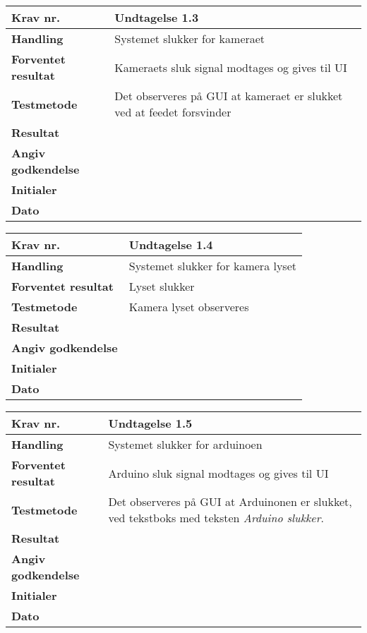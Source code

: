 	\begin{center}
		\begin{longtable}{ | m{4cm}| m{8.5cm}|} 
			\hline
			\textbf{Krav nr.} & Undtagelse 1.3  \\ 
			\hline
			\textbf{Handling} & Systemet slukker for kameraet  \\
			\hline
			\textbf{Forventet resultat} & Kameraets sluk signal modtages og gives til UI \\
			\hline
			\textbf{Testmetode}  & Det observeres på GUI at kameraet er slukket ved at feedet forsvinder \\
			\hline
			\textbf{Resultat}  &    \\
			\hline
			\textbf{Angiv godkendelse} &     \\
			\hline
			\textbf{Initialer} &     \\
			\hline
			\textbf{Dato} &    \\
			\hline
		\end{longtable}
	\end{center}
			
	\begin{center}
		\begin{longtable}{ | m{4cm}| m{8.5cm}|} 
			\hline
			\textbf{Krav nr.} & Undtagelse 1.4  \\ 
			\hline
			\textbf{Handling} & Systemet slukker for kamera lyset   \\
			\hline
			\textbf{Forventet resultat} & Lyset slukker \\
			\hline
			\textbf{Testmetode}  & Kamera lyset observeres  \\
			\hline
			\textbf{Resultat}  &    \\
			\hline
			\textbf{Angiv godkendelse} &     \\
			\hline
			\textbf{Initialer} &     \\
			\hline
			\textbf{Dato} &    \\
			\hline
		\end{longtable}
	\end{center}		
			
\newpage			
			
	\begin{center}
		\begin{longtable}{ | m{4cm}| m{8.5cm}|} 
			\hline
			\textbf{Krav nr.} & Undtagelse 1.5  \\ 
			\hline
			\textbf{Handling} & Systemet slukker for arduinoen   \\
			\hline
			\textbf{Forventet resultat} & Arduino sluk signal modtages og gives til UI \\
			\hline
			\textbf{Testmetode}  & Det observeres på GUI at Arduinonen er slukket, ved tekstboks med teksten \textit{Arduino slukker}.  \\
			\hline
			\textbf{Resultat}  &    \\
			\hline
			\textbf{Angiv godkendelse} &     \\
			\hline
			\textbf{Initialer} &     \\
			\hline
			\textbf{Dato} &    \\
			\hline
		\end{longtable}
	\end{center}